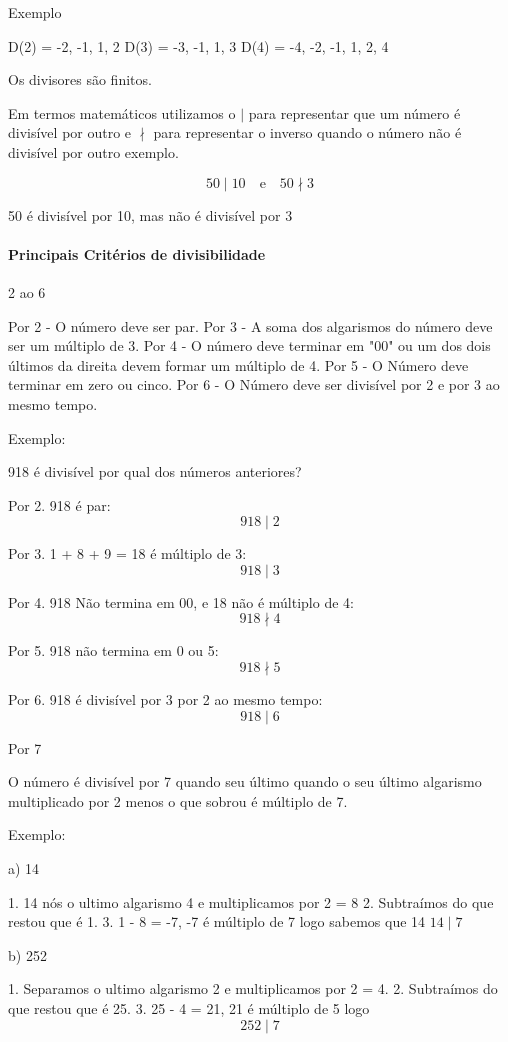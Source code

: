 \documentclass[letterpaper]{book}
\begin{document}
Exemplo

D(2) = {-2, -1, 1, 2}
D(3) = {-3, -1, 1, 3}
D(4) = {-4, -2, -1, 1, 2, 4}

Os divisores são finitos.

Em termos matemáticos utilizamos o \(\mid\) para representar que um número é divisível por outro e \(\nmid\) para representar o inverso quando o número não é divisível por outro exemplo.

\[50 \mid 10  \quad \text{e} \quad 50 \nmid 3\]

50 é divisível por 10, mas não é divisível por 3

\paragraph{Principais Critérios de divisibilidade}

2 ao 6

Por 2 - O número deve ser par.
Por 3 - A soma dos algarismos do número deve ser um múltiplo de 3.
Por 4 - O número deve terminar em "00" ou um dos dois últimos da direita devem formar um múltiplo de 4.
Por 5 - O Número deve terminar em zero ou cinco.
Por 6 - O Número deve ser divisível por 2 e por 3 ao mesmo tempo.

Exemplo:

918 é divisível por qual dos números anteriores?

Por 2. 918 é par:
\[918 \mid 2\]

Por 3. 1 + 8 + 9 = 18 é múltiplo de 3: 
\[918 \mid 3\]

Por 4. 918 Não termina em 00, e 18 não é múltiplo de 4: 
\[918 \nmid 4\]

Por 5. 918 não termina em 0 ou 5:
\[918 \nmid 5\]

Por 6. 918 é divisível por 3 por 2 ao mesmo tempo:
\[918 \mid 6\]

Por 7

O número é divisível por 7 quando seu último quando o seu último algarismo multiplicado por 2 menos o que sobrou é múltiplo de 7.

Exemplo:

a) 14

1. 14 nós o ultimo algarismo 4 e multiplicamos por 2 = 8
2. Subtraímos do que restou que é 1.
3. 1 - 8 = -7, -7 é múltiplo de 7 logo sabemos que 14 \(14 \mid 7\)

b) 252 

1. Separamos o ultimo algarismo 2 e multiplicamos por 2 = 4.
2. Subtraímos do que restou que é 25.
3. 25 - 4 = 21, 21 é múltiplo de 5 logo \[252 \mid 7\]
\end{document}
